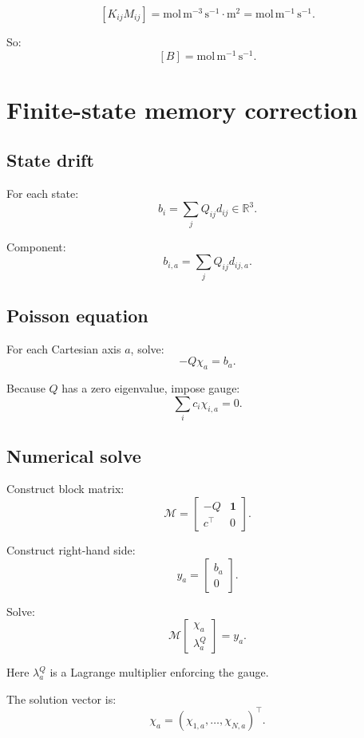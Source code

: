 \documentclass[11pt]{article}
\newcommand{\R}{\mathbb R}
\newcommand{\one}{\mathbf 1}
\begin{document}
  \[
  [K_{ij}M_{ij}]
  =
  \mathrm{mol\,m^{-3}\,s^{-1}}\cdot \mathrm{m^2}
  =
  \mathrm{mol\,m^{-1}\,s^{-1}}.
  \]

  So:
  \[
  [B]=\mathrm{mol\,m^{-1}\,s^{-1}}.
  \]

  \section{Finite-state memory correction}

  \subsection{State drift}

  For each state:
  \[
  b_i=\sum_jQ_{ij}d_{ij}\in\R^3.
  \]

  Component:
  \[
  b_{i,a}=\sum_jQ_{ij}d_{ij,a}.
  \]

  \subsection{Poisson equation}

  For each Cartesian axis \(a\), solve:
  \[
  -Q\chi_a=b_a.
  \]

  Because \(Q\) has a zero eigenvalue, impose gauge:
  \[
  \sum_i c_i\chi_{i,a}=0.
  \]

  \subsection{Numerical solve}

  Construct block matrix:
  \[
  \mathcal M
  =
  \begin{bmatrix}
  -Q & \one\\
  c^\top & 0
  \end{bmatrix}.
  \]

  Construct right-hand side:
  \[
  y_a=
  \begin{bmatrix}
  b_a\\
  0
  \end{bmatrix}.
  \]

  Solve:
  \[
  \mathcal M
  \begin{bmatrix}
  \chi_a\\
  \lambda_a^{Q}
  \end{bmatrix}
  =
  y_a.
  \]

  Here \(\lambda_a^{Q}\) is a Lagrange multiplier enforcing the gauge.

  The solution vector is:
  \[
  \chi_a=(\chi_{1,a},\ldots,\chi_{N,a})^\top.
  \]
\end{document}
